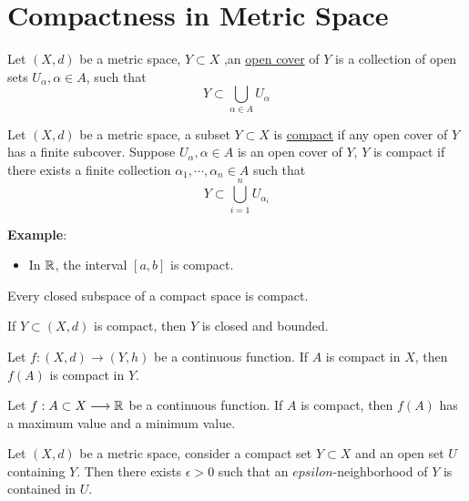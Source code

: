 \section{Compactness in Metric Space}

\begin{definition}
    Let $(X,d)$ be a metric space, $Y \subset X$ ,an \underline{open cover} of $Y$ is a collection of open sets $U_\alpha,\alpha \in A$, such that $$Y \subset \bigcup_{\alpha \in A}U_{\alpha}$$
\end{definition}

\begin{definition}
    Let $(X,d)$ be a metric space, a subset $Y \subset X$ is \underline{compact} if any open cover of $Y$ has a finite subcover.
    Suppose $U_{\alpha},\alpha \in A$ is an open cover of $Y$, $Y$ is compact if there exists a finite collection $\alpha_1,\cdots,\alpha_n \in A$ such that $$Y \subset \bigcup_{i=1}^n U_{\alpha_i}$$
\end{definition}
\noindent \textbf{Example}:
\begin{itemize}
    \item In $\mathbb{R}$, the interval $[a,b]$ is compact.
\end{itemize}

\begin{theorem}
    Every closed subspace of a compact space is compact.
\end{theorem}

\begin{theorem}\label{compactimpliesclosedbounded}
    If $Y \subset (X,d)$ is compact, then $Y$ is closed and bounded.
\end{theorem}

\begin{theorem} \label{lemmaevt}
    Let $f:(X,d) \longrightarrow (Y,h)$ be a continuous function. If $A$ is compact in $X$, then $f(A)$ is compact in $Y$.
\end{theorem}

\begin{corollary} \label{evt}
    Let $f:A \subset X \longrightarrow \mathbb{R}$ be a continuous function. If $A$ is compact, then $f(A)$ has a maximum value and a minimum value.
\end{corollary}

\begin{theorem} \label{epsilon neighborhood thm}
    Let $(X,d)$ be a metric space, consider a compact set $Y \subset X$ and an open set $U$ containing $Y$. 
    Then there exists $\epsilon>0$ such that an $epsilon$-neighborhood of $Y$ is contained in $U$.
\end{theorem}

